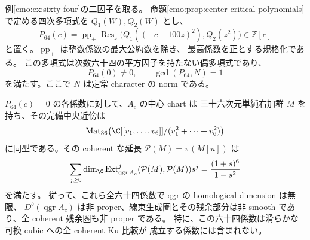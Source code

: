 \begin{theorem}
\label{cmo:thm:morse-singular-sixty-four}
例\ref{cmo:ex:sixty-four}の二因子を取る。
命題\ref{cmo:prop:center-critical-polynomials}で定める四次多項式を $Q_1(W),Q_2(W)$ とし、
\begin{equation}\label{cmo:eq:morse-resultant}
 P_{64}(c)=\operatorname{pp}_+
   \operatorname{Res}_{z}\bigl(Q_1((-c-100z)^2),Q_2(z^2)\bigr)
       \in\mathbb Z[c]
\end{equation}
と置く。$\operatorname{pp}_+$ は整数係数の最大公約数を除き、
最高係数を正とする規格化である。
この多項式は次数六十四の平方因子を持たない偶多項式であり、
\[
 P_{64}(0)\ne0,\qquad \gcd(P_{64},N)=1
\]
を満たす。ここで $N$ は定常 character の norm である。

$P_{64}(c)=0$ の各係数に対して、$A_c$ の中心 chart は
三十六次元単純右加群 $M$ を持ち、その完備中央近傍は
\begin{equation}\label{cmo:eq:morse-matrix-node}
 \operatorname{Mat}_{36}\!\left(
   \C[[v_1,\ldots,v_6]]/(v_1^2+\cdots+v_6^2)\right)
\end{equation}
に同型である。その coherent な延長 $\mathcal P(M)=\pi(M[u])$ は
\begin{equation}\label{cmo:eq:morse-self-ext}
 \sum_{j\ge0}\dim_\C\operatorname{Ext}_{\operatorname{qgr}A_c}^j
       (\mathcal P(M),\mathcal P(M))s^j
       =\frac{(1+s)^6}{1-s^2}
\end{equation}
を満たす。
従って、これら全六十四係数で qgr の homological dimension は無限、
$D^b(\operatorname{qgr}A_c)$ は非 proper、線束生成圏とその残余部分は非 smooth であり、全 coherent 残余圏も非 proper である。
特に、この六十四係数は滑らかな可換 cubic への全 coherent Ku 比較が
成立する係数には含まれない。
\end{theorem}
